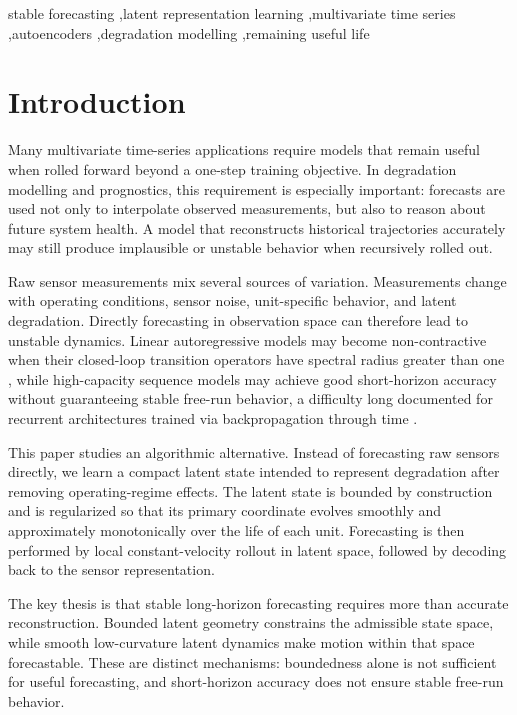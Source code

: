 \documentclass[a4paper,fleqn]{cas-sc}
\begin{document}
\begin{keywords}
stable forecasting \sep latent representation learning \sep multivariate time series \sep autoencoders \sep degradation modelling \sep remaining useful life
\end{keywords}

\maketitle

\section{Introduction}

Many multivariate time-series applications require models that remain useful
when rolled forward beyond a one-step training objective. In degradation
modelling and prognostics, this requirement is especially important: forecasts
are used not only to interpolate observed measurements, but also to reason
about future system health. A model that reconstructs historical trajectories
accurately may still produce implausible or unstable behavior when recursively
rolled out.

Raw sensor measurements mix several sources of variation. Measurements change
with operating conditions, sensor noise, unit-specific behavior, and latent
degradation. Directly forecasting in observation space can therefore lead to
unstable dynamics. Linear autoregressive models may become non-contractive
when their closed-loop transition operators have spectral radius greater than
one \citep{hamilton1994time,lutkepohl2005new}, while high-capacity sequence
models may achieve good short-horizon accuracy without guaranteeing stable
free-run behavior, a difficulty long documented for recurrent architectures
trained via backpropagation through time \citep{pascanu2013difficulty}.

This paper studies an algorithmic alternative. Instead of forecasting raw
sensors directly, we learn a compact latent state intended to represent
degradation after removing operating-regime effects. The latent state is
bounded by construction and is regularized so that its primary coordinate
evolves smoothly and approximately monotonically over the life of each unit.
Forecasting is then performed by local constant-velocity rollout in latent
space, followed by decoding back to the sensor representation.

The key thesis is that stable long-horizon forecasting requires more than
accurate reconstruction. Bounded latent geometry constrains the admissible state
space, while smooth low-curvature latent dynamics make motion within that
space forecastable. These are distinct mechanisms: boundedness alone is not
sufficient for useful forecasting, and short-horizon accuracy does not ensure
stable free-run behavior.
\end{document}
